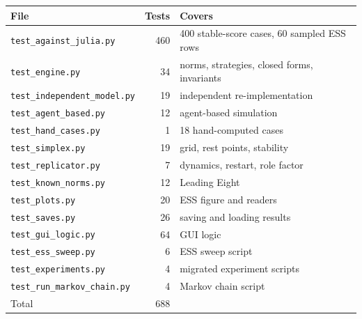 \begin{tabular}{@{}lrl@{}}
\toprule
File & Tests & Covers \\
\midrule
\texttt{test\_against\_julia.py} & 460 & 400 stable-score cases, 60 sampled ESS rows \\
\texttt{test\_engine.py} & 34 & norms, strategies, closed forms, invariants \\
\texttt{test\_independent\_model.py} & 19 & independent re-implementation \\
\texttt{test\_agent\_based.py} & 12 & agent-based simulation \\
\texttt{test\_hand\_cases.py} & 1 & 18 hand-computed cases \\
\texttt{test\_simplex.py} & 19 & grid, rest points, stability \\
\texttt{test\_replicator.py} & 7 & dynamics, restart, role factor \\
\texttt{test\_known\_norms.py} & 12 & Leading Eight \\
\texttt{test\_plots.py} & 20 & ESS figure and readers \\
\texttt{test\_saves.py} & 26 & saving and loading results \\
\texttt{test\_gui\_logic.py} & 64 & GUI logic \\
\texttt{test\_ess\_sweep.py} & 6 & ESS sweep script \\
\texttt{test\_experiments.py} & 4 & migrated experiment scripts \\
\texttt{test\_run\_markov\_chain.py} & 4 & Markov chain script \\
\midrule
Total & 688 & \\
\bottomrule
\end{tabular}
